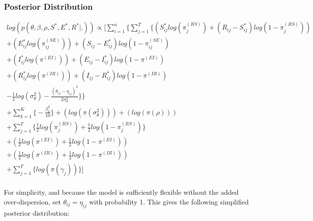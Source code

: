 \documentclass[12pt]{article}
\begin{document}
\subsubsection{Posterior Distribution}

\begin{center}
\begin{multline}
\displaystyle
log(p(\theta,\beta,\rho,S^*,E^*,R^*|.)) \propto \Bigg[ 
    \sum_{i=1}^n \bigg\{ \sum_{j=1}^T
        \Big\{
            (S^*_{ij}log(\pi_j^{(RS)}) + (R_{ij} - S^*_{ij})log(1-\pi_j^{(RS)})) \\
            + (E^*_{ij}log(\pi_{ij}^{(SE)})) + (S_{ij} - E^*_{ij})log(1-\pi_{ij}^{(SE)}) \\
            + (I^*_{ij}log(\pi^{(EI)})) + (E_{ij} - I^*_{ij})log(1-\pi^{(EI)}) \\
            + (R^*_{ij}log(\pi^{(IR)})) + (I_{ij} - R^*_{ij})log(1-\pi^{(IR)}) \\
    - \frac{1}{2}log(\sigma^2_{\theta}) - \frac{(\theta_{ij}-\eta_{ij})^2}{2\sigma^2_{\theta}}\Big\}\bigg\} \\
    + \sum_{k = 1}^K\bigg\{-\frac{\beta^2_k}{10}\bigg\}
            + (log(\pi(\sigma^2_{\theta})))
            + (log(\pi(\rho)))\\
            +  \sum_{j=1}^{T} \bigg\{\frac{1}{2}log(\pi^{(RS)}_j) + \frac{1}{2}log(1-\pi^{(RS)}_j)   \bigg\} \\
            + (\frac{1}{2}log(\pi^{(EI)}) + \frac{1}{2}log(1-\pi^{(EI)})) \\
            + (\frac{1}{2}log(\pi^{(IR)}) + \frac{1}{2}log(1-\pi^{(IR)}))    \\
            + \sum_{j=1}^{T} \bigg\{ log(\pi(\gamma_j)) \bigg\} \Bigg]\\
\end{multline}
\end{center}

For simplicity, and because the model is sufficiently flexible without the added over-dispersion, set $\theta_{ij} = \eta_{ij}$ with probability 1. This 
gives the following simplified posterior distribution:
\end{document}
